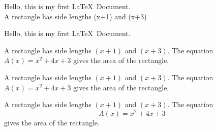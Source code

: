 \documentclass[11pt]{article}
\begin{document}
Hello, this is my first \LaTeX\ Document. \\
A rectangle has side lengths (x+1) and (x+3)

\vspace{0.5cm}
Hello, this is my first \LaTeX\ Document.

A rectangle has side lengths $(x+1)$ and $(x+3)$. 
The equation $A(x)=x^2+4x+3$ gives the area of the rectangle.

\vspace{0.5cm}
A rectangle has side lengths $(x+1)$ and $(x+3)$. 
The equation ${A(x)=x^2+4x+3}$ gives the area of the rectangle.

A rectangle has side lengths $(x+1)$ and $(x+3)$. 
The equation $${A(x)=x^2+4x+3}$$ gives the area of the rectangle.
\end{document}
